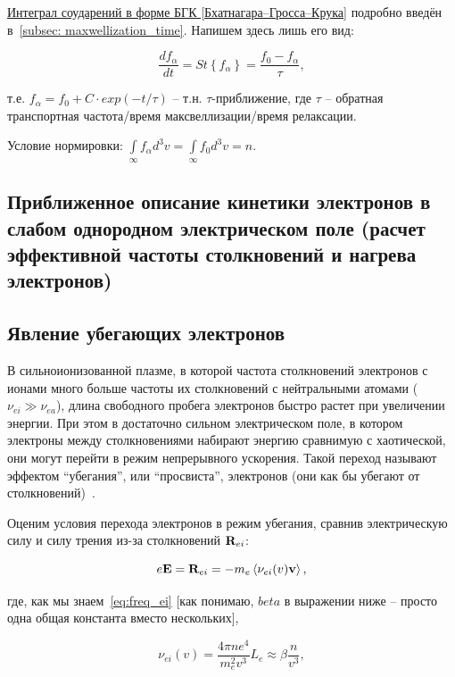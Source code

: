\documentclass[10pt, a4paper]{article}
\begin{document}
\uline{Интеграл соударений в форме БГК [Бхатнагара–Гросса–Крука]} подробно введён в~\ref{subsec: maxwellization_time}. Напишем здесь лишь его вид:

\begin{equation} \label{eq:BGK_collision_term}
	\frac{df_\alpha}{dt} = St\left\lbrace f_\alpha\right\rbrace = \frac{f_0-f_\alpha}{\tau},
\end{equation}

т.е. $f_\alpha = f_0 + C\cdot exp(-t/\tau)$ -- т.н. $\tau$-приближение, где $\tau$ -- обратная транспортная частота/время максвеллизации/время релаксации.

Условие нормировки: $\int\limits_{\infty}f_\alpha d^3v =\int\limits_{\infty}f_0d^3v = n$.

\subsection{Приближенное описание кинетики электронов в слабом однородном электрическом поле (расчет эффективной частоты столкновений и нагрева электронов)}

\subsection{Явление убегающих электронов}

В сильноионизованной плазме, в которой частота столкновений электронов с ионами много больше частоты их столкновений с нейтральными атомами ($\nu_{ei}\gg\nu_{ea}$), длина свободного пробега электронов быстро растет при увеличении энергии. При этом в достаточно сильном электрическом поле, в котором электроны между столкновениями набирают энергию сравнимую с хаотической, они могут перейти в режим непрерывного ускорения. Такой переход называют эффектом ``убегания'', или ``просвиста'', электронов (они как бы убегают от столкновений)~\cite{golant}.

Оценим условия перехода электронов в режим убегания, сравнив электрическую силу и силу трения из-за столкновений $\vb{R}_{ei}$:

\begin{equation*}
	e\vb{E}=\vb{R}_{ei}=-m_e\left\langle \nu_{ei}(v)\vb{v}\right\rangle, 
\end{equation*}

где, как мы знаем~\eqref{eq:freq_ei} [как понимаю, $beta$ в выражении ниже -- просто одна общая константа вместо нескольких],

\begin{equation*}
	\nu_{ei}(v) = \frac{4\pi n e^4}{m_e^2v^3}L_e\approx\beta \frac{n}{v^3},
\end{equation*}
\end{document}
